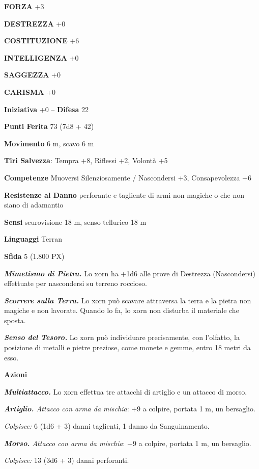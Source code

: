 \begin{multicols}{2}
\textbf{FORZA} +3

\textbf{DESTREZZA} +0

\textbf{COSTITUZIONE} +6

\textbf{INTELLIGENZA} +0

\textbf{SAGGEZZA} +0

\textbf{CARISMA} +0

\textbf{Iniziativa} +0 -- \textbf{Difesa} 22

\textbf{Punti Ferita} 73 (7d8 + 42)

\textbf{Movimento} 6 m, scavo 6 m

\textbf{Tiri Salvezza}: Tempra +8, Riflessi +2, Volontà +5

\textbf{Competenze} Muoversi Silenziosamente / Nascondersi +3, Consapevolezza +6

\textbf{Resistenze al Danno} perforante e tagliente di armi non magiche o che non siano di adamantio

\textbf{Sensi} scurovisione 18 m, senso tellurico 18 m

\textbf{Linguaggi} Terran

\textbf{Sfida} 5 (1.800 PX)

\textit{\textbf{Mimetismo di Pietra.}} Lo xorn ha +1d6 alle prove di Destrezza (Nascondersi) effettuate per nascondersi su terreno roccioso.

\textit{\textbf{Scorrere sulla Terra.}} Lo xorn può scavare attraversa la terra e la pietra non magiche e non lavorate. Quando lo fa, lo xorn non disturba il materiale che sposta.

\textit{\textbf{Senso del Tesoro.}} Lo xorn può individuare precisamente, con l'olfatto, la posizione di metalli e pietre preziose, come monete e gemme, entro 18 metri da esso.

\textbf{Azioni}

\textit{\textbf{Multiattacco.}} Lo xorn effettua tre attacchi di artiglio e un attacco di morso.

\textit{\textbf{Artiglio.} Attacco con arma da mischia}: +9 a colpire, portata 1 m, un bersaglio.

\textit{Colpisce:} 6 (1d6 + 3) danni taglienti, 1 danno da Sanguinamento.

\textit{\textbf{Morso.} Attacco con arma da mischia}: +9 a colpire, portata 1 m, un bersaglio.

\textit{Colpisce:} 13 (3d6 + 3) danni perforanti.


\end{multicols}
